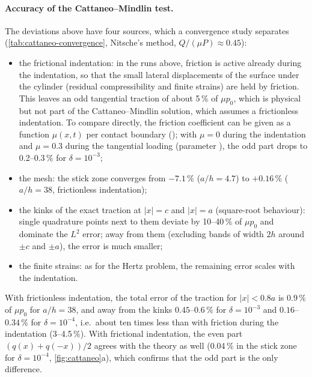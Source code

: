 \documentclass[11pt,a4paper]{article}
\begin{document}
\paragraph{Accuracy of the Cattaneo--Mindlin test.}
The deviations above have four sources, which a convergence study separates
(\cref{tab:cattaneo-convergence}, Nitsche's method, $Q/(\mu P)\approx0.45$):
\begin{itemize}
  \item the frictional indentation: in the runs above, friction is active already during the
    indentation, so that the small lateral displacements of the surface under the cylinder
    (residual compressibility and finite strains) are held by friction. This leaves an odd
    tangential traction of about 5\,\% of $\mu p_0$, which is physical but not part of the
    Cattaneo--Mindlin solution, which assumes a frictionless indentation. To compare directly, the
    friction coefficient can be given as a function $\mu(x,t)$ per contact boundary
    (); with $\mu=0$ during the indentation
    and $\mu=0.3$ during the tangential loading (parameter ), the odd
    part drops to 0.2--0.3\,\% for $\delta=10^{-3}$;
  \item the mesh: the stick zone converges from $-7.1\,\%$ ($a/h=4.7$) to $+0.16\,\%$
    ($a/h=38$, frictionless indentation);
  \item the kinks of the exact traction at $|x|=c$ and $|x|=a$ (square-root behaviour): single
    quadrature points next to them deviate by 10--40\,\% of $\mu p_0$ and dominate the $L^2$ error;
    away from them (excluding bands of width $2h$ around $\pm c$ and $\pm a$), the error is much
    smaller;
  \item the finite strains: as for the Hertz problem, the remaining error scales with the
    indentation.
\end{itemize}
With frictionless indentation, the total error of the traction for $|x|<0.8a$ is $0.9\,\%$ of
$\mu p_0$ for $a/h=38$, and away from the kinks $0.45$--$0.6\,\%$ for $\delta=10^{-3}$ and
$0.16$--$0.34\,\%$ for $\delta=10^{-4}$, i.e.\ about ten times less than with friction during the
indentation (3--4.5\,\%). With frictional indentation, the even part $(q(x)+q(-x))/2$ agrees with
the theory as well (0.04\,\% in the stick zone for $\delta=10^{-4}$, \cref{fig:cattaneo}a), which
confirms that the odd part is the only difference.
\end{document}
